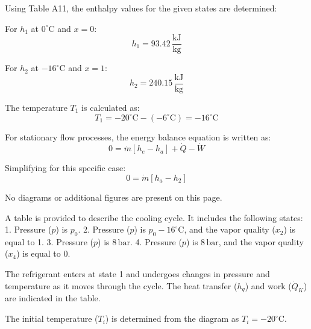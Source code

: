 Using Table A11, the enthalpy values for the given states are determined:  

For \( h_1 \) at \( 0^\circ\text{C} \) and \( x = 0 \):  
\[
h_1 = 93.42 \, \frac{\text{kJ}}{\text{kg}}
\]  

For \( h_2 \) at \( -16^\circ\text{C} \) and \( x = 1 \):  
\[
h_2 = 240.15 \, \frac{\text{kJ}}{\text{kg}}
\]  

The temperature \( T_1 \) is calculated as:  
\[
T_1 = -20^\circ\text{C} - (-6^\circ\text{C}) = -16^\circ\text{C}
\]  

For stationary flow processes, the energy balance equation is written as:  
\[
0 = \dot{m} \left[ h_e - h_a \right] + \dot{Q} - \dot{W}
\]  

Simplifying for this specific case:  
\[
0 = \dot{m} \left[ h_a - h_2 \right]
\]  

No diagrams or additional figures are present on this page.

A table is provided to describe the cooling cycle. It includes the following states:  
1. Pressure (\(p\)) is \(p_0\).  
2. Pressure (\(p\)) is \(p_0 - 16^\circ\text{C}\), and the vapor quality (\(x_2\)) is equal to 1.  
3. Pressure (\(p\)) is \(8 \, \text{bar}\).  
4. Pressure (\(p\)) is \(8 \, \text{bar}\), and the vapor quality (\(x_4\)) is equal to 0.  

The refrigerant enters at state 1 and undergoes changes in pressure and temperature as it moves through the cycle. The heat transfer (\(h_q\)) and work (\(\dot{Q}_K\)) are indicated in the table.  

The initial temperature (\(T_i\)) is determined from the diagram as \(T_i = -20^\circ\text{C}\).